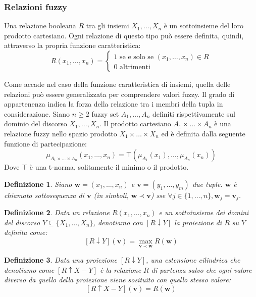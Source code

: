 \documentclass[10pt,a4paper]{article}
\newtheorem{definition}{Definizione}
\newcommand{\ww}{\mathbf{w}}
\newcommand{\vv}{\mathbf{v}}
\begin{document}
\subsubsection{Relazioni fuzzy}

Una relazione booleana $R$ tra gli insiemi $X_1, \dots, X_n$ è un sottoinsieme del loro prodotto cartesiano. Ogni relazione di questo tipo può essere definita, quindi, attraverso la propria funzione caratteristica:
$$
R(x_1,\dots,x_n) = \begin{cases}
						1 \text{ se e solo se } (x_1, \dots, x_n) \in R \\
						0 \text{ altrimenti }
					\end{cases}
$$

Come accade nel caso della funzione caratteristica di insiemi, quella delle relazioni può essere generalizzata per comprendere valori fuzzy. Il grado di appartenenza indica la forza della relazione tra i membri della tupla in considerazione. Siano $n \geq 2$ fuzzy set $A_1, \dots, A_n$ definiti rispettivamente sul dominio del discorso $X_1, \dots, X_n$. Il prodotto cartesiano $A_1 \times \dots \times A_n$ è una relazione fuzzy nello spazio prodotto $X_1 \times \dots \times X_n$ ed è definita dalla seguente funzione di partecipazione:
$$
\mu_{A_1 \times \dots \times A_n}(x_1, \dots, x_n) = \top(\mu_{A_1}(x_1), \dots,\mu_{A_n}(x_n))
$$	 
Dove $\top$ è una t-norma, solitamente il minimo o il prodotto.

\begin{definition}
Siano $\ww = (x_1, \dots, x_n)$ e $\vv = (y_1, \dots, y_m)$ due tuple. $\ww$ è chiamato \emph{sottosequenza} di $\vv$ (in simboli, $\ww \prec \vv$) sse $\forall j \in \{1,\dots,n\}, \ww_j = \vv_j$.
\end{definition}

\begin{definition}
Data un relazione $R(x_1,\dots,x_n)$ e un sottoinsieme dei domini del discorso $Y \subseteq \{X_1, \dots, X_n\}$, denotiamo con $[R \downarrow Y]$ la \emph{proiezione} di $R$ su $Y$ definita come:
$$
[R \downarrow Y](\vv) = \max_{\vv \prec \ww} R(\ww)
$$
\end{definition}

\begin{definition}
Data una proiezione $[R \downarrow Y]$, una \emph{estensione cilindrica} che denotiamo come $[R \uparrow X-Y]$ è la relazione $R$ di partenza salvo che ogni valore diverso da quello della proiezione viene sosituito con quello stesso valore:
$$
[R \uparrow X-Y](\vv) = R(\ww)
$$
\end{definition}
\end{document}
